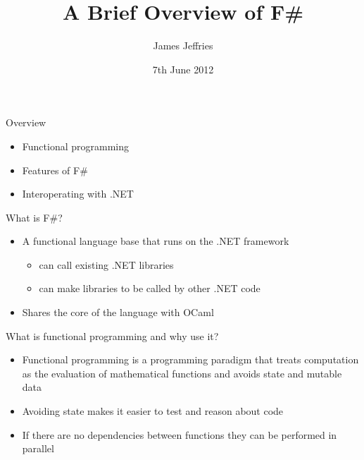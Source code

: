 \documentclass[landscape]{slides}
\author{James Jeffries}
\title{A Brief Overview of F\#}
\date{7th June 2012}
\begin{document}
\begin{slide}
\maketitle
\end{slide}

\begin{slide}{Overview}
\begin{itemize}
\item Functional programming 
\item Features of F\#
\item Interoperating with .NET
\end{itemize}
\end{slide}

\begin{slide}{What is F\#?}
\begin{itemize}
\item A functional language base that runs on the .NET framework
\begin{itemize}
\item can call existing .NET libraries
\item can make libraries to be called by other .NET code
\end{itemize}
\item Shares the core of the language with OCaml
\end{itemize}
\end{slide}

\begin{slide}{What is functional programming and why use it?}
\begin{itemize}
\item Functional programming is a programming paradigm that treats computation as the evaluation of mathematical functions and avoids state and mutable data
\item Avoiding state makes it easier to test and reason about code
\item If there are no dependencies between functions they can be performed in parallel
\end{itemize}
\end{slide}
\end{document}
